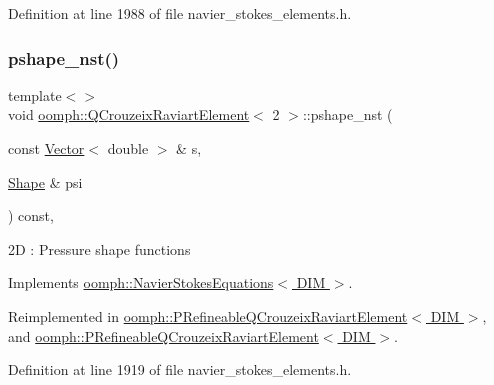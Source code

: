 Definition at line 1988 of file navier\+\_\+stokes\+\_\+elements.\+h.

\mbox{\label{classoomph_1_1QCrouzeixRaviartElement_a34e6743118c6e0c14733de53e66c2ea1}} 
\subsubsection{\texorpdfstring{pshape\+\_\+nst()}{pshape\_nst()}\hspace{0.1cm}{\footnotesize\ttfamily [3/4]}}
{\footnotesize\ttfamily template$<$$>$ \\
void \hyperlink{classoomph_1_1QCrouzeixRaviartElement}{oomph\+::\+Q\+Crouzeix\+Raviart\+Element}$<$ 2 $>$\+::pshape\+\_\+nst (\begin{DoxyParamCaption}\item[{const \hyperlink{classoomph_1_1Vector}{Vector}$<$ double $>$ \&}]{s,  }\item[{\hyperlink{classoomph_1_1Shape}{Shape} \&}]{psi }\end{DoxyParamCaption}) const\hspace{0.3cm}{\ttfamily [inline]}, {\ttfamily [virtual]}}

2D \+: Pressure shape functions 

Implements \hyperlink{classoomph_1_1NavierStokesEquations_a487030303b71da299aed3d4639a022ab}{oomph\+::\+Navier\+Stokes\+Equations$<$ D\+I\+M $>$}.



Reimplemented in \hyperlink{classoomph_1_1PRefineableQCrouzeixRaviartElement_a556b7533944abd5eedce664d708b4eae}{oomph\+::\+P\+Refineable\+Q\+Crouzeix\+Raviart\+Element$<$ D\+I\+M $>$}, and \hyperlink{classoomph_1_1PRefineableQCrouzeixRaviartElement_a87afeb50892736eace1e3d68d6c53172}{oomph\+::\+P\+Refineable\+Q\+Crouzeix\+Raviart\+Element$<$ D\+I\+M $>$}.



Definition at line 1919 of file navier\+\_\+stokes\+\_\+elements.\+h.

\mbox{\label{classoomph_1_1QCrouzeixRaviartElement_aec2e85c8a3d6fcd64f7f4f8f8028f893}} 
